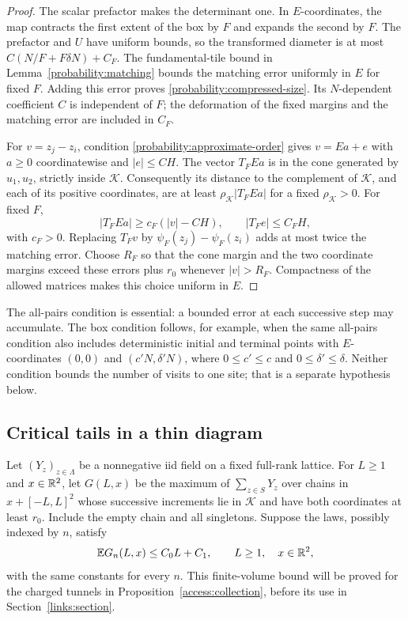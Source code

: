\begin{proof}
The scalar prefactor makes the determinant one.  In $E$-coordinates,
the map contracts the first extent of the box by $F$ and expands
the second by $F$.  The prefactor and $U$ have uniform bounds, so
the transformed diameter is at most
$C(N/F+F\delta N)+C_F$.  The fundamental-tile bound in
Lemma~\ref{probability:matching} bounds the matching error
uniformly in $E$ for fixed $F$.  Adding this error proves
\eqref{probability:compressed-size}.  Its $N$-dependent coefficient
$C$ is independent of $F$; the deformation of the fixed margins
and the matching error are included in $C_F$.

For $v=z_j-z_i$, condition
\eqref{probability:approximate-order} gives $v=Ea+e$ with
$a\ge0$ coordinatewise and $|e|\le CH$.  The vector $T_FEa$
is in the cone generated by $u_1,u_2$, strictly inside
$\mathcal K$.  Consequently its distance to the complement of
$\mathcal K$, and each of its positive coordinates, are at least
$\rho_{\mathcal K}|T_FEa|$ for a fixed $\rho_{\mathcal K}>0$.
For fixed $F$,
\[
 |T_FEa|\ge c_F(|v|-CH),\qquad |T_Fe|\le C_FH,
\]
with $c_F>0$.  Replacing $T_Fv$ by
$\psi_F(z_j)-\psi_F(z_i)$ adds at most twice the matching
error.  Choose $R_F$ so that the cone margin and the two coordinate
margins exceed these errors plus $r_0$ whenever $|v|>R_F$.
Compactness of the allowed matrices makes this choice uniform in
$E$.
\end{proof}

The all-pairs condition is essential: a bounded error at each
successive step may accumulate.  The box condition follows, for
example, when the same all-pairs condition also includes
deterministic initial and terminal points with $E$-coordinates
$(0,0)$ and $(c'N,\delta'N)$, where $0\le c'\le c$ and
$0\le\delta'\le\delta$.  Neither condition bounds the number of
visits to one site; that is a separate hypothesis below.

\subsection{Critical tails in a thin diagram}

Let $(Y_z)_{z\in\Lambda}$ be a nonnegative iid field on a fixed
full-rank lattice.  For $L\ge1$ and $x\in\mathbb R^2$, let $G(L,x)$
be the maximum of $\sum_{z\in S}Y_z$ over chains in
$x+[-L,L]^2$ whose successive increments lie in $\mathcal K$
and have both coordinates at least $r_0$.  Include the empty chain
and all singletons.  Suppose the laws, possibly indexed by $n$,
satisfy
\begin{equation}
 \mathbb E G_n(L,x)\le C_0L+C_1,
 \qquad L\ge1,\quad x\in\mathbb R^2,
 \label{probability:collection-assumption}
\end{equation}
with the same constants for every $n$.  This finite-volume bound
will be proved for the charged tunnels in
Proposition~\ref{access:collection}, before its use in
Section~\ref{links:section}.

